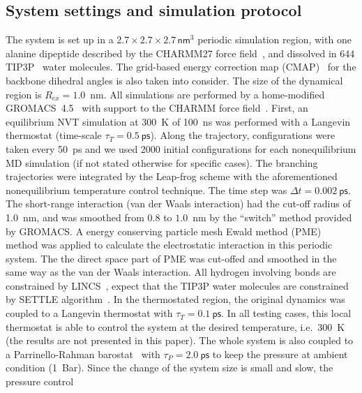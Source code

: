 \documentclass[a4paper,preprint,unsortedaddress,onecolumn]{revtex4-1}
\newcommand{\recheck}[1]{{\color{red} #1}}
\newcommand{\vect}[1]{\textbf{\textit{#1}}}
\begin{document}
\subsection{System settings and simulation protocol}
The system is set up in a $2.7\times 2.7\times
2.7\, \textsf{nm}^3$ periodic simulation region, with one alanine dipeptide
described by the CHARMM27 force field~\cite{foloppe2000all}, and dissolved in 644 TIP3P~\cite{jorgensen1983comparison}
water molecules.  \recheck{The grid-based energy correction map (CMAP)~\cite{mackerell2004extending}
for the backbone dihedral angles is also taken into consider.}
The size of the  dynamical region is $R_{ex} = 1.0$~nm.
All simulations are performed by a home-modified GROMACS~4.5~\cite{pronk2013gromacs} with support to the CHARMM
force field~\cite{bjelkmar2010implementation}.
First, an equilibrium NVT simulation at 300~K of
100~\textsf{ns} was performed with a Langevin thermostat (time-scale
$\tau_T = 0.5~\textsf{ps}$).  Along the trajectory, configurations were taken every
50~\textsf{ps} and we used 2000 initial configurations for each nonequilibrium
MD simulation (if not stated otherwise for specific cases).
The branching trajectories were integrated by the
Leap-frog scheme with the aforementioned nonequilibrium
temperature control technique.  The
time step was $\Delta t = 0.002~\textsf{ps}$.
\recheck{The short-range
interaction (van der Waals interaction)
had the cut-off radius of 1.0~nm, and was smoothed from $0.8$ to $1.0$~nm by the
``switch'' method provided by GROMACS.
A energy conserving particle mesh Ewald method (PME)~\cite{darden1993pme, essmann1995spm}
method was applied to calculate the electrostatic interaction in this
periodic system. The the direct space part of PME was cut-offed and smoothed in the
same way as the van der Waals interaction.}
\recheck {All hydrogen involving bonds are constrained by LINCS~\cite{hess1997lincs}, expect that
  the TIP3P water molecules are constrained by SETTLE algorithm~\cite{miyamoto2004settle}.}
In the thermostated region, the original dynamics was
coupled to a Langevin thermostat with $\tau_T = 0.1~\textsf{ps}$.
  In all testing cases, this local thermostat is able to control
  the system at the desired temperature, i.e.~300~K (the results
  are not presented in this paper).
The whole system is also coupled to a Parrinello-Rahman barostat~\cite{parrinello1981polymorphic} with $\tau_P = 2.0~\textsf{ps}$ to keep
the pressure at ambient condition (1~Bar). Since the
change of the system size is small and slow, the pressure control
\end{document}
